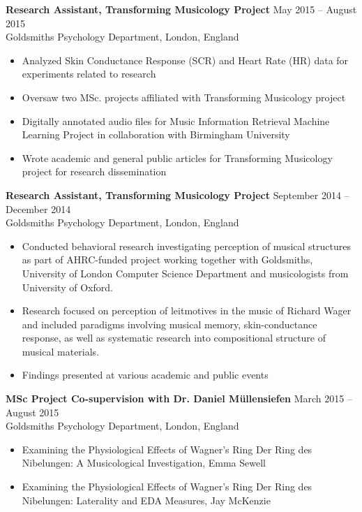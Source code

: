 \textbf{Research Assistant, Transforming Musicology Project} \hfill May  2015 -- August 2015 \\
Goldsmiths Psychology Department, London, England \hfill 
\begin{itemize} \itemsep -2pt %
\item  Analyzed Skin Conductance Response (SCR) and Heart Rate (HR) data for experiments related to research %
\item  Oversaw two MSc. projects affiliated with Transforming Musicology project
\item  Digitally annotated audio files for Music Information Retrieval Machine Learning Project in collaboration with Birmingham University %
\item  Wrote academic and general public articles for Transforming Musicology project for research dissemination %
\end{itemize}

\textbf{Research Assistant, Transforming Musicology Project} \hfill September  2014 -- December 2014 \\
Goldsmiths Psychology Department, London, England \hfill 
\begin{itemize} \itemsep -2pt %
\item Conducted behavioral research investigating perception of musical structures as part of AHRC-funded project working together with Goldsmiths, University of London Computer Science Department and musicologists from University of Oxford.
\item Research focused on perception of leitmotives in the music of Richard Wager and included paradigms involving musical memory, skin-conductance response, as well as systematic research into compositional structure of musical materials. %
\item Findings presented at various academic and public events
\end{itemize}
\textbf{MSc Project Co-supervision with Dr. Daniel M\"{u}llensiefen} \hfill March 2015 -- August 2015 \\
Goldsmiths Psychology Department, London, England \hfill 
\begin{itemize} \itemsep -2pt %
\item  Examining the Physiological Effects of Wagner's Ring Der Ring des Nibelungen: A Musicological Investigation, Emma Sewell
\item Examining the Physiological Effects of Wagner's Ring Der Ring des Nibelungen:  Laterality and EDA Measures, Jay McKenzie
\end{itemize}

